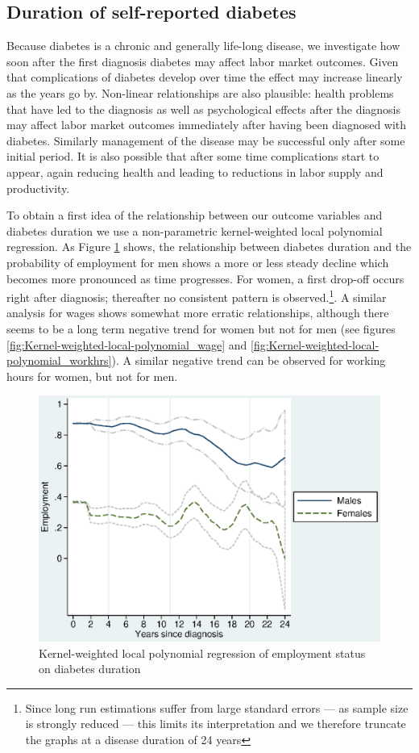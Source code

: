 \documentclass[12pt,english]{article}
\begin{document}
\FloatBarrier

\subsection{Duration of self-reported  diabetes }


Because diabetes is a chronic and generally life-long disease, we investigate how soon after the first diagnosis diabetes may affect labor market outcomes. Given that complications of diabetes develop over time the effect may increase linearly as the years go by. Non-linear relationships are also plausible: health problems that have led to the diagnosis as well as psychological effects after the diagnosis may affect labor market outcomes immediately after having been diagnosed with diabetes. Similarly management of the disease may be successful only after some initial period. It is also possible that after some time complications start to appear, again reducing health and leading to reductions in labor supply and productivity.


To obtain a first idea of the relationship between our outcome variables and diabetes duration we use a non-parametric kernel-weighted local polynomial regression. As Figure \ref{fig:Kernel-weighted-local-polynomial_empl} shows, the relationship between diabetes duration and the probability of employment for men shows a more or less steady decline which becomes more pronounced as time progresses. For women,
a first drop-off occurs right after diagnosis; thereafter no consistent pattern is observed.\footnote{Since long run estimations suffer from large standard errors --- as sample size is strongly reduced --- this limits its interpretation and we therefore truncate the graphs at a disease duration of 24 years}. A similar analysis for wages shows somewhat more erratic relationships, although there seems to be a long term negative trend for women but not for men (see figures \ref{fig:Kernel-weighted-local-polynomial_wage} and \ref{fig:Kernel-weighted-local-polynomial_workhrs}).  A similar negative trend can be observed for working hours for women, but not for men.

  

\begin{figure}[h!]
\caption{\label{fig:Kernel-weighted-local-polynomial_empl}Kernel-weighted local
polynomial regression of employment status on diabetes duration}%
\begin{center}
\includegraphics[width=0.5\columnwidth]{figures/lpoly_works_diabetesduration.eps}
\end{center}
\end{figure}
\end{document}
